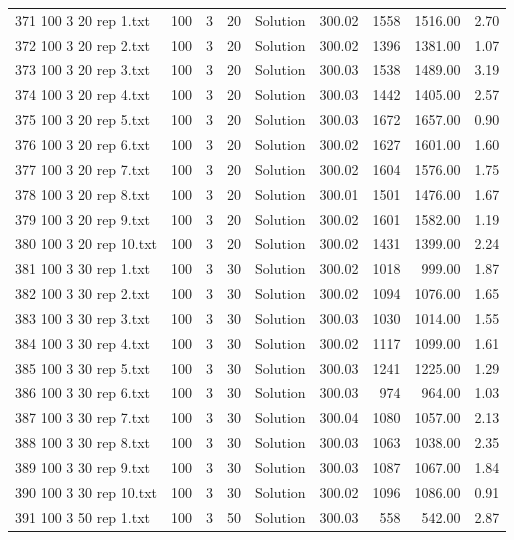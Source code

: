 \begin{longtable}{lrrllrrrr}
371 100 3 20 rep 1.txt & 100 & 3 & 20 & Solution & 300.02 & 1558 & 1516.00 &  2.70\\
372 100 3 20 rep 2.txt & 100 & 3 & 20 & Solution & 300.02 & 1396 & 1381.00 &  1.07\\
373 100 3 20 rep 3.txt & 100 & 3 & 20 & Solution & 300.03 & 1538 & 1489.00 &  3.19\\
374 100 3 20 rep 4.txt & 100 & 3 & 20 & Solution & 300.03 & 1442 & 1405.00 &  2.57\\
375 100 3 20 rep 5.txt & 100 & 3 & 20 & Solution & 300.03 & 1672 & 1657.00 &  0.90\\
376 100 3 20 rep 6.txt & 100 & 3 & 20 & Solution & 300.02 & 1627 & 1601.00 &  1.60\\
377 100 3 20 rep 7.txt & 100 & 3 & 20 & Solution & 300.02 & 1604 & 1576.00 &  1.75\\
378 100 3 20 rep 8.txt & 100 & 3 & 20 & Solution & 300.01 & 1501 & 1476.00 &  1.67\\
379 100 3 20 rep 9.txt & 100 & 3 & 20 & Solution & 300.02 & 1601 & 1582.00 &  1.19\\
380 100 3 20 rep 10.txt & 100 & 3 & 20 & Solution & 300.02 & 1431 & 1399.00 &  2.24\\
381 100 3 30 rep 1.txt & 100 & 3 & 30 & Solution & 300.02 & 1018 & 999.00 &  1.87\\
382 100 3 30 rep 2.txt & 100 & 3 & 30 & Solution & 300.02 & 1094 & 1076.00 &  1.65\\
383 100 3 30 rep 3.txt & 100 & 3 & 30 & Solution & 300.03 & 1030 & 1014.00 &  1.55\\
384 100 3 30 rep 4.txt & 100 & 3 & 30 & Solution & 300.02 & 1117 & 1099.00 &  1.61\\
385 100 3 30 rep 5.txt & 100 & 3 & 30 & Solution & 300.03 & 1241 & 1225.00 &  1.29\\
386 100 3 30 rep 6.txt & 100 & 3 & 30 & Solution & 300.03 & 974 & 964.00 &  1.03\\
387 100 3 30 rep 7.txt & 100 & 3 & 30 & Solution & 300.04 & 1080 & 1057.00 &  2.13\\
388 100 3 30 rep 8.txt & 100 & 3 & 30 & Solution & 300.03 & 1063 & 1038.00 &  2.35\\
389 100 3 30 rep 9.txt & 100 & 3 & 30 & Solution & 300.03 & 1087 & 1067.00 &  1.84\\
390 100 3 30 rep 10.txt & 100 & 3 & 30 & Solution & 300.02 & 1096 & 1086.00 &  0.91\\
391 100 3 50 rep 1.txt & 100 & 3 & 50 & Solution & 300.03 & 558 & 542.00 &  2.87\\

\end{longtable}
